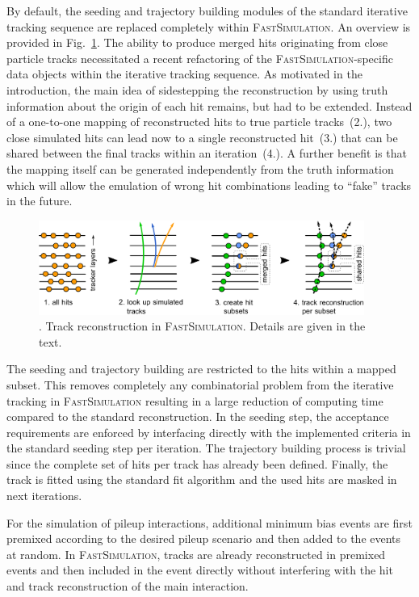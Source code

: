 \documentclass[a4paper]{jpconf}
\begin{document}
By default, the seeding and trajectory building modules of the standard iterative tracking sequence are replaced completely within \textsc{FastSimulation}. An overview is provided in Fig.~\ref{fig:tracking}. The ability to produce merged hits originating from close particle tracks necessitated a recent refactoring of the \textsc{FastSimulation}-specific data objects within the iterative tracking sequence. As motivated in the introduction, the main idea of sidestepping the reconstruction by using truth information about the origin of each hit remains, but had to be extended. Instead of a one-to-one mapping of reconstructed hits to true particle tracks~(2.), two close simulated hits can lead now to a single reconstructed hit~(3.) that can be shared between the final tracks within an iteration~(4.). A further benefit is that the mapping itself can be generated independently from the truth information which will allow the emulation of wrong hit combinations leading to ``fake'' tracks in the future.

\begin{figure}[htbp]
\begin{center}
\includegraphics[width=0.95\textwidth]{figures/tracking.pdf}
\caption{\label{fig:tracking}. Track reconstruction in \textsc{FastSimulation}. Details are given in the text.}
\end{center}
\end{figure}

The seeding and trajectory building are restricted to the hits within a mapped subset. This removes completely any combinatorial problem from the iterative tracking in \textsc{FastSimulation} resulting in a large reduction of computing time compared to the standard reconstruction. In the seeding step, the acceptance requirements are enforced by interfacing directly with the implemented criteria in the standard seeding step per iteration. The trajectory building process is trivial since the complete set of hits per track has already been defined. Finally, the track is fitted using the standard fit algorithm and the used hits are masked in next iterations.


For the simulation of pileup interactions, additional minimum bias events are first premixed according to the desired pileup scenario and then added to the events at random. In \textsc{FastSimulation}, tracks are already reconstructed in premixed events and then included in the event directly without interfering with the hit and track reconstruction of the main interaction.
\end{document}

